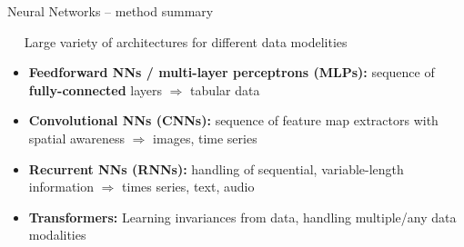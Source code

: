 
\begin{frame}{Neural Networks -- method summary}

 ~~ Large variety of architectures for different data modelities
\begin{itemize}
  \item \textbf{Feedforward NNs / multi-layer perceptrons (MLPs):} sequence of 
  \textbf{fully-connected} layers $\Rightarrow$ tabular data
  \item \textbf{Convolutional NNs (CNNs):} sequence of feature map extractors 
  with spatial awareness $\Rightarrow$ images, time series
  \item \textbf{Recurrent NNs (RNNs):} handling of sequential, variable-length 
  information $\Rightarrow$ times series, text, audio
  \item \textbf{Transformers:} Learning invariances from data, handling multiple/any data modalities
\end{itemize}


\end{frame}
